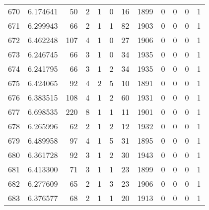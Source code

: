 \begin{tabular}{lrrrrrrrrrrr}
670 &  6.174641 &   50 &      2 &        1 &      0 &              16 &  1899 &               0 &               0 &               0 &               1 \\
671 &  6.299943 &   66 &      2 &        1 &      1 &              82 &  1903 &               0 &               0 &               0 &               1 \\
672 &  6.462248 &  107 &      4 &        1 &      0 &              27 &  1906 &               0 &               0 &               0 &               1 \\
673 &  6.246745 &   66 &      3 &        1 &      0 &              34 &  1935 &               0 &               0 &               0 &               1 \\
674 &  6.241795 &   66 &      3 &        1 &      2 &              34 &  1935 &               0 &               0 &               0 &               1 \\
675 &  6.424065 &   92 &      4 &        2 &      5 &              10 &  1891 &               0 &               0 &               0 &               1 \\
676 &  6.383515 &  108 &      4 &        1 &      2 &              60 &  1931 &               0 &               0 &               0 &               1 \\
677 &  6.698535 &  220 &      8 &        1 &      1 &              11 &  1901 &               0 &               0 &               0 &               1 \\
678 &  6.265996 &   62 &      2 &        1 &      2 &              12 &  1932 &               0 &               0 &               0 &               1 \\
679 &  6.489958 &   97 &      4 &        1 &      5 &              31 &  1895 &               0 &               0 &               0 &               1 \\
680 &  6.361728 &   92 &      3 &        1 &      2 &              30 &  1943 &               0 &               0 &               0 &               1 \\
681 &  6.413300 &   71 &      3 &        1 &      1 &              23 &  1899 &               0 &               0 &               0 &               1 \\
682 &  6.277609 &   65 &      2 &        1 &      3 &              23 &  1906 &               0 &               0 &               0 &               1 \\
683 &  6.376577 &   68 &      2 &        1 &      1 &              20 &  1913 &               0 &               0 &               0 &               1 \\

\end{tabular}
